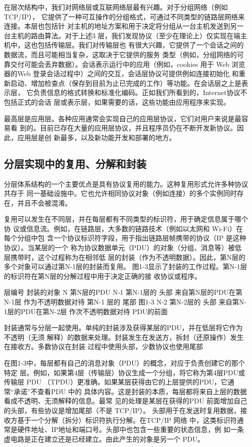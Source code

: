 在层次结构中，我们对网络层或互联网络层最有兴趣。对于分组网络（例如 TCP/IP），
它提供了一种可互操作的分组格式，可通过不同类型的链路层网络来连接。本层也包括针
对主机的地址方案和用于决定将分组从一台主机发送到另一台主机的路由算法。对于上述3
层，我们发现协议（至少在理论上）仅实现在端主机中，这也包括传输层。我们对传输层也
有很大兴趣，它提供了一个会话之间的数据流，而且可能相当复杂，这取决于它提供的服务
类型（例如，分组网络的可靠交付可能会丢弃数据）。会话表示运行中的应用（例如，cookies
用于 Web 浏览器的Web 登录会话过程中）之间的交互，会话层协议可提供例如连接初始化
和重新启动、增加检查点（保存到目前为止已完成的工作）等功能。在会话层之上是表示层，
它负责信息的格式转换和标准化编码。正如我们所看到的，Internet协议不包括正式的会话
层或表示层，如果需要的话，这些功能由应用程序来实现。

最高层是应用层。各种应用通常会实现自己的应用层协议，它们对用户来说是最容易看
到的。目前已存在大量的应用层协议，并且程序员仍在不断开发新协议。因此，应用层是创
新最多，以及新功能开发和部署的地方。

\subsection{分层实现中的复用、分解和封装}
分层体系结构的一个主要优点是具有协议复用的能力。这种复用形式允许多种协议共存于
同一基础设施中。它也允许相同协议对象（例如连接）的多个实例同时存在，并且不会被混淆。

复用可以发生在不同层，并在每层都有不同类型的标识符，用于确定信息属于哪个协
议或信息流。例如，在链路层，大多数的链路技术（例如以太网和 Wi-Fi）在每个分组中包
含一个协议标识符字段，用于指出链路层帧携带的协议（IP 是这种协议）。当某层的一个
称为协议数据单元（PDU）的对象（分组、消息等）被低层携带时，这个过程称为在相邻低
层的封装（作为不透明数据）。因此，第N层的多个对象可以通过第N-1层的封装而复用。
图1-3显示了封装的工作过程。第N-1层的标识符在第N层的分解过程中用于决定正确的接
收协议或程序。

层编号
封装的对象
N
第N层的PDU
N-1
第N-1层的
头部
来自第N层的PDU在第N-1层
作为不透明数据对待
第N-1
层的
尾部
图1-3
N-2
第N-2层的
头部
来自第N-1层的PDU在第N-2层
作次不透明数据对待
PDU的前面

封装通常与分层一起使用。单纯的封装涉及获得某层的PDU，并在低层将它作为不透明（无须
解释）的数据来处理。封装发生在发送方，拆封（还原操作）发生在接收方。多数协议在封装
过程中使用头部，少数协议也使用尾部

在图1-3中，每层都有自己的消息对象（PDU）的概念，对应于负责创建它的那个特定
层。例如，如果第4层（传输层）协议生成一个分组，将它称为第4层PDU或传输层 PDU
（TPDU）更准确。如果某层获得由它的上层提供的PDU，它通常“承诺”不查看PDU 中的
具体内容。这是封装的本质，每层都将来自上层的数据看成不透明、无须解释的信息。最常
见的处理是某层在获得的PDU 前面增加自己的头部，有些协议是增加尾部（不是 TCP/IP）。
头部用于在发送时复用数据，接收方基于一个分解（拆分）标识符执行分解。在TCP/IP 网络
中，这类标识符通常是硬件地址、IP地址和端口号。头部中也包含一些重要的状态信息，例
如一条虚电路是正在建立还是已经建立。由此产生的对象是另一个 PDU。

